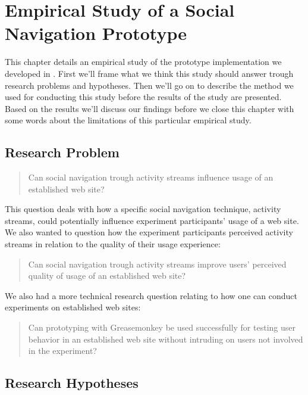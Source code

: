 \chapter{Empirical Study of a Social Navigation Prototype}
\label{chapter:empirical}

This chapter details an empirical study of the prototype implementation we
developed in . First we'll frame what we think this
study should answer trough research problems and hypotheses. Then we'll go on
to describe the method we used for conducting this study before the results of
the study are presented. Based on the results we'll discuss our findings
before we close this chapter with some words about the limitations of this
particular empirical study.

\section{Research Problem}

\begin{quote}
  Can social navigation trough activity streams influence
  usage of an established web site?
\end{quote}

This question deals with how a specific social navigation technique, activity
streams, could potentially influence experiment participants' usage of a web
site. We also wanted to question how the experiment participants perceived
activity streams in relation to the quality of their usage experience:

\begin{quote}
  Can social navigation trough activity streams improve users' perceived
  quality of usage of an established web site?
\end{quote}

We also had a more technical research question relating to how one can
conduct experiments on established web sites:

\begin{quote}
  Can prototyping with Greasemonkey be used successfully
  for testing user behavior in an established web site without
  intruding on users not involved in the experiment?
\end{quote}

\section{Research Hypotheses}

